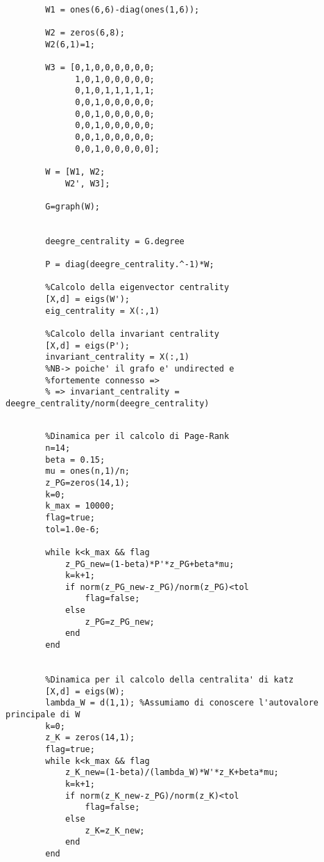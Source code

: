 \begin{alphaparts}
    \questionpart
    \begin{lstlisting}
       
        W1 = ones(6,6)-diag(ones(1,6));
        
        W2 = zeros(6,8);
        W2(6,1)=1;
        
        W3 = [0,1,0,0,0,0,0,0;
              1,0,1,0,0,0,0,0;
              0,1,0,1,1,1,1,1;
              0,0,1,0,0,0,0,0;
              0,0,1,0,0,0,0,0;
              0,0,1,0,0,0,0,0;
              0,0,1,0,0,0,0,0;
              0,0,1,0,0,0,0,0];
        
        W = [W1, W2;
            W2', W3];
        
        G=graph(W);
        
        
        deegre_centrality = G.degree
        
        P = diag(deegre_centrality.^-1)*W;
        
        %Calcolo della eigenvector centrality
        [X,d] = eigs(W');
        eig_centrality = X(:,1)
        
        %Calcolo della invariant centrality
        [X,d] = eigs(P');
        invariant_centrality = X(:,1)
        %NB-> poiche' il grafo e' undirected e 
        %fortemente connesso =>
        % => invariant_centrality = deegre_centrality/norm(deegre_centrality)      
        
    \end{lstlisting}

    \questionpart
    \begin{lstlisting}
        %Dinamica per il calcolo di Page-Rank
        n=14;
        beta = 0.15;
        mu = ones(n,1)/n;
        z_PG=zeros(14,1);
        k=0;
        k_max = 10000;
        flag=true;
        tol=1.0e-6;
        
        while k<k_max && flag
            z_PG_new=(1-beta)*P'*z_PG+beta*mu;
            k=k+1;
            if norm(z_PG_new-z_PG)/norm(z_PG)<tol
                flag=false;
            else
                z_PG=z_PG_new;
            end
        end
               
        
        %Dinamica per il calcolo della centralita' di katz
        [X,d] = eigs(W);
        lambda_W = d(1,1); %Assumiamo di conoscere l'autovalore principale di W
        k=0;
        z_K = zeros(14,1);
        flag=true;
        while k<k_max && flag
            z_K_new=(1-beta)/(lambda_W)*W'*z_K+beta*mu;
            k=k+1;
            if norm(z_K_new-z_PG)/norm(z_K)<tol
                flag=false;
            else
                z_K=z_K_new;
            end
        end
    \end{lstlisting}


\end{alphaparts}
